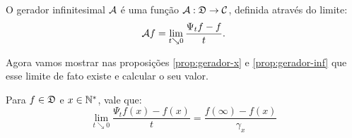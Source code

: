 \begin{definicao}
  \label{def:gerador}
  O gerador infinitesimal ${\mathcal{A}}$ é uma função ${\mathcal{A}}: {\mathfrak{D}} \to {\mathcal{C}}$,
  definida através do limite:
  \begin{equation}
    \label{eq:def-gerador}
    {\mathcal{A}} f = \lim_{t \searrow 0} \frac{\Psi_t f - f}{t}.
  \end{equation}
\end{definicao}

Agora vamos mostrar nas proposições \ref{prop:gerador-x} e
\ref{prop:gerador-inf} que esse limite de fato existe e calcular o seu
valor.

\begin{proposicao}
  \label{prop:gerador-x}
  Para $f \in {\mathfrak{D}}$ e $x \in {\mathbb{N^*}}$, vale que:
  \begin{equation}
    \label{eq:gerador-x}
    \lim_{t \searrow 0} \frac{\Psi_t f(x) - f(x)}{t} = \frac{f(\infty)
    - f(x)}{\gamma_x}
  \end{equation}
\end{proposicao}

